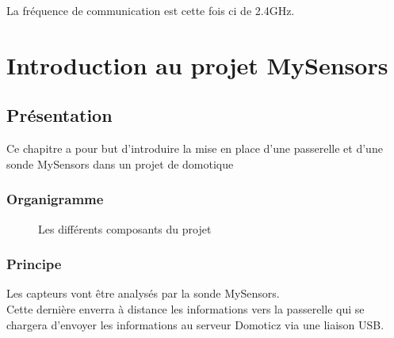  La fréquence de communication est cette fois ci de 2.4GHz.


 \chapter{Introduction au projet MySensors}


\section{Présentation}

Ce chapitre a pour but d'introduire la mise en place d'une passerelle et d'une sonde MySensors dans un projet de domotique

\subsection{Organigramme}

\begin{figure}[h]
  \centering
{} 
\caption{Les différents composants du projet}
\end{figure}

  \subsection{Principe}

  Les capteurs vont être analysés par la sonde MySensors.\\
  Cette dernière enverra à distance les informations vers la passerelle qui se chargera d'envoyer les informations au serveur Domoticz via une liaison USB.\\



